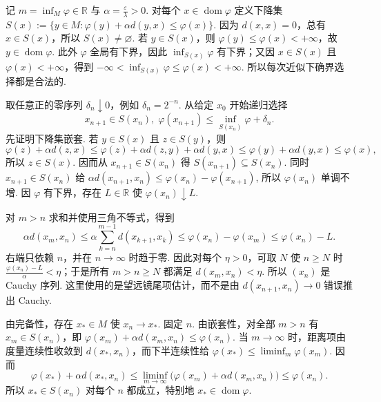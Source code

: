\begin{FAProof}
记 \(\displaystyle m=\inf_M\varphi\in\mathbb R\) 与 \(\displaystyle\alpha=\frac{\varepsilon}{\lambda}>0\). 对每个 \(\displaystyle x\in\operatorname{dom}\varphi\) 定义下降集
\(\displaystyle S(x) := \{y\in M:\varphi(y)+\alpha d(y,x)\leqslant\varphi(x)\}\).
因为 \(\displaystyle d(x,x)=0\)，总有 \(\displaystyle x\in S(x)\)，所以 \(\displaystyle S(x)\neq\varnothing\). 若 \(\displaystyle y\in S(x)\)，则 \(\displaystyle\varphi(y)\leqslant\varphi(x)<+\infty\)，故 \(\displaystyle y\in\operatorname{dom}\varphi\). 此外 \(\displaystyle\varphi\) 全局有下界，因此 \(\displaystyle\inf_{S(x)}\varphi\) 有下界；又因 \(\displaystyle x\in S(x)\) 且 \(\displaystyle\varphi(x)<+\infty\)，得到
\(\displaystyle -\infty < \inf_{S(x)}\varphi \leqslant \varphi(x) < +\infty\).
所以每次近似下确界选择都是合法的.

取任意正的零序列 \(\displaystyle\delta_n\downarrow0\)，例如 \(\displaystyle\delta_n=2^{-n}\). 从给定 \(\displaystyle x_0\) 开始递归选择
\[
x_{n+1}\in S(x_n),
\;
\varphi(x_{n+1})
\leqslant
\inf_{S(x_n)}\varphi+\delta_n.
\]
先证明下降集嵌套. 若 \(\displaystyle y\in S(x)\) 且 \(\displaystyle z\in S(y)\)，则
\[
\varphi(z)+\alpha d(z,x)
\leqslant
\varphi(z)+\alpha d(z,y)+\alpha d(y,x)
\leqslant
\varphi(y)+\alpha d(y,x)
\leqslant
\varphi(x),
\]
所以 \(\displaystyle z\in S(x)\). 因而从 \(\displaystyle x_{n+1}\in S(x_n)\) 得
\(\displaystyle S(x_{n+1})\subseteq S(x_n)\).
同时 \(\displaystyle x_{n+1}\in S(x_n)\) 给
\(\displaystyle \alpha d(x_{n+1},x_n) \leqslant \varphi(x_n)-\varphi(x_{n+1})\),
所以 \(\displaystyle\varphi(x_n)\) 单调不增. 因 \(\displaystyle\varphi\) 有下界，存在 \(\displaystyle L\in\mathbb R\) 使 \(\displaystyle\varphi(x_n)\downarrow L\).

对 \(\displaystyle m>n\) 求和并使用三角不等式，得到
\[
\alpha d(x_m,x_n)
\leqslant
\alpha\sum_{k=n}^{m-1}d(x_{k+1},x_k)
\leqslant
\varphi(x_n)-\varphi(x_m)
\leqslant
\varphi(x_n)-L.
\]
右端只依赖 \(\displaystyle n\)，并在 \(\displaystyle n\to\infty\) 时趋于零. 因此对每个 \(\displaystyle\eta>0\)，可取 \(\displaystyle N\) 使 \(\displaystyle n\geqslant N\) 时 \(\displaystyle\frac{\varphi(x_n)-L}{\alpha}<\eta\)；于是所有 \(\displaystyle m>n\geqslant N\) 都满足 \(\displaystyle d(x_m,x_n)<\eta\). 所以 \(\displaystyle(x_n)\) 是 Cauchy 序列. 这里使用的是望远镜尾项估计，而不是由 \(\displaystyle d(x_{n+1},x_n)\to0\) 错误推出 Cauchy.

由完备性，存在 \(\displaystyle x_*\in M\) 使 \(\displaystyle x_n\to x_*\). 固定 \(\displaystyle n\). 由嵌套性，对全部 \(\displaystyle m>n\) 有 \(\displaystyle x_m\in S(x_n)\)，即
\(\displaystyle \varphi(x_m)+\alpha d(x_m,x_n) \leqslant \varphi(x_n)\).
当 \(\displaystyle m\to\infty\) 时，距离项由度量连续性收敛到 \(\displaystyle d(x_*,x_n)\)，而下半连续性给 \(\displaystyle\varphi(x_*)\leqslant\liminf_m\varphi(x_m)\). 因而
\[
\varphi(x_*)+
\alpha d(x_*,x_n)
\leqslant
\liminf_{m\to\infty}
\bigl(\varphi(x_m)+\alpha d(x_m,x_n)\bigr)
\leqslant
\varphi(x_n).
\]
所以 \(\displaystyle x_*\in S(x_n)\) 对每个 \(\displaystyle n\) 都成立，特别地 \(\displaystyle x_*\in\operatorname{dom}\varphi\).


\end{FAProof}
